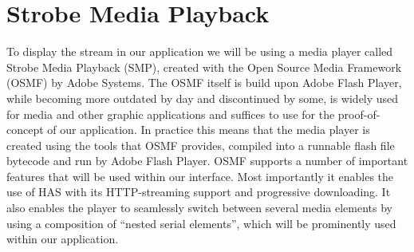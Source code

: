 \section{Strobe Media Playback}
\label{sec:smp}

To display the stream in our application we will be using a media player called Strobe Media Playback (SMP), created with the Open Source Media Framework (OSMF) by Adobe Systems. The OSMF itself is build upon Adobe Flash Player, while becoming more outdated by day and discontinued by some, is widely used for media and other graphic applications and suffices to use for the proof-of-concept of our application. In practice this means that the media player is created using the tools that OSMF provides, compiled into a runnable flash file bytecode and run by Adobe Flash Player. 
OSMF supports a number of important features that will be used within our interface. Most importantly it enables the use of HAS with its HTTP-streaming support and progressive downloading. It also enables the player to seamlessly switch between several media elements by using a composition of “nested serial elements”, which will be prominently used within our application\cite{osmf}.

